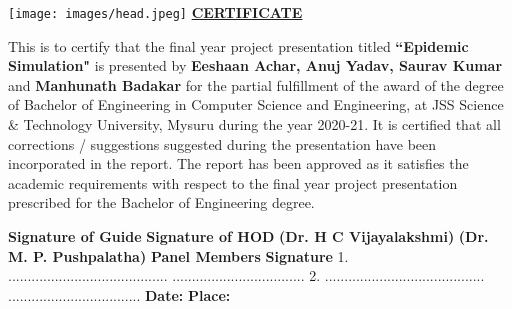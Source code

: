 \documentclass[12pt, a4paper]{extarticle}
\begin{document}
    \newpage
    \begin{titlepage}
        \thisfancypage{
            \setlength{\fboxsep}{1pt}
            \doublebox
        }{}
        \begin{center}
            \texttt{[image: images/head.jpeg]}
            \textbf{\large{\underline{CERTIFICATE}}}
            \vspace{1in}
            
            \justifying
                This is to certify that the final year project presentation titled \textbf{``Epidemic Simulation"} is presented by \textbf{Eeshaan Achar, Anuj Yadav, Saurav Kumar} and \textbf{Manhunath Badakar} for the partial fulfillment of the award of the degree of Bachelor of Engineering in Computer Science and Engineering, at JSS Science \& Technology University, Mysuru during the year 2020-21. It is certified that all corrections / suggestions suggested during the presentation have been incorporated in the report. The report has been approved as it satisfies the academic requirements with respect to the final year project presentation prescribed for the Bachelor of Engineering degree.
            
            \vspace{2in}
            \flushleft\hspace{1.75cm}\textbf{Signature of Guide} \hspace{5cm}\textbf{Signature of HOD}
            \flushleft\hspace{1.25cm}\textbf{(Dr. H C Vijayalakshmi)} \hspace{4cm}\textbf{(Dr. M. P. Pushpalatha)}
            \vspace{0.5in}
            \flushleft\hspace{2cm}\textbf{Panel Members} \hspace{6cm}\textbf{Signature}
            \vspace{6mm}
            \flushleft \hspace{1cm}1. .........................................
            \hspace{4.25cm}..................................
            \newline
            \flushleft \hspace{1cm}2. .........................................
            \hspace{4.25cm}..................................
            \newline
            \vspace{5mm}
            \flushleft\hspace{1cm}\textbf{Date:} \hspace{8cm}\textbf{Place:}
        \end{center}
    \end{titlepage}
    
\end{document}

